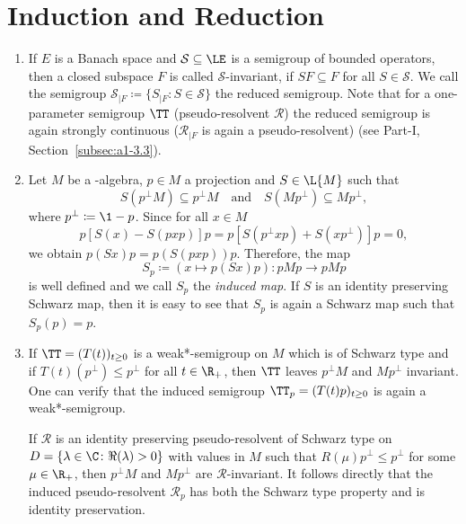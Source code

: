 \section{Induction and Reduction}\label{sec:d1-3}
\begin{enumerate}[1., wide, labelindent=.25em]
\item
If\/ $ E $ is a Banach space and $ \mathcal{S} \subseteq \LE $ is a semigroup of bounded operators, then a closed subspace $ F $ is called $ \mathcal{S} $-invariant, if\/ $ SF \subseteq F $ for all $ S \in \mathcal{S} $.
We call the semigroup $ \mathcal{S}_{\vert F} \coloneqq \{S_{\vert F} \colon S \in \mathcal{S} \} $ the reduced semigroup.
Note that for a one-parameter semigroup $ \TT $ (\resp pseudo-resolvent $ \mathcal{R} $) the reduced semigroup is again strongly continuous (\resp $ \mathcal{R}_{\vert F} $ is again a pseudo-resolvent) (see Part-I, Section~\ref{subsec:a1-3.3}).

\item\label{item:d1-3.2}
Let $ M $ be a \WA-algebra, $ p \in M $ a projection and $ S \in \L{M} $ such that 
%
\[
	S( p^{\perp}M ) \subseteq p^{\perp}M 
	\quad \text{and} \quad 
	S( Mp^{\perp}) \subseteq Mp^{\perp} ,  
\]
%
where $ p^{\perp} \coloneqq \1-p $.
Since for all $ x \in M $
\[
p[S(x) - S(pxp)]p = p[S(p^{\perp}xp) + S(xp^{\perp})]p = 0,
\]
we obtain $ p(Sx)p = p(S(pxp))p $.
Therefore, the map
\[
S_{p} \coloneqq (x \mapsto p(Sx)p) \colon pMp \to pMp
\]
is well defined and we call $ S_{p} $ the \emph{induced map}.
If\/ $ S $ is an identity preserving Schwarz map, then it is easy to see that $ S_{p} $ is again a Schwarz map such that $ S_{p}(p) = p $.

\item
If\/ $ \TT = (T(t))_{t\geq0} $ is a weak*-semigroup on $ M $ which is of Schwarz type and if\/ $ T(t)(p^{\perp}) \leq p^{\perp} $ for all $ t \in \R_{+} $, then $ \TT $ leaves $ p^{\perp}M $ and $ Mp^{\perp} $ invariant.
One can verify that the induced semigroup $\TT_p = (T(t)p)_{t \geq 0}$ is again a weak*-semigroup.

If  $ \mathcal{R} $ is an identity preserving pseudo-resolvent of Schwarz type on $ D = \{\lambda \in \C \colon \Re(\lambda) > 0\} $ with values in $ M $ such that $ R(\mu)p^{\perp} \leq p^{\perp} $ for some $ \mu \in \R_{+} $, then $ p^{\perp}M $ and $ Mp^{\perp} $ are  $ \mathcal{R} $-invariant.
It follows directly that the induced pseudo-resolvent $ \mathcal{R}_p$ has both the Schwarz type property and is identity preservation.


\end{enumerate}
